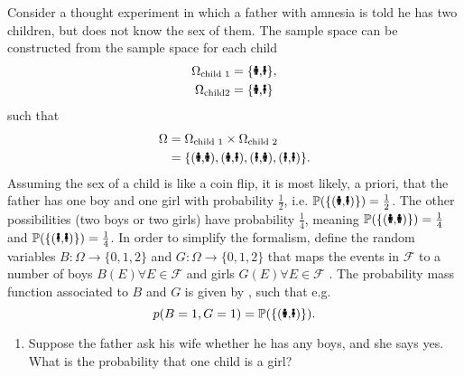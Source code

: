 \begin{example}
	Consider a thought experiment in which a father with amnesia is told he has two children, but does not know the sex of them. The sample space can be constructed from the sample space for each child
	\begin{equation}
		\begin{split}
			\Omega_{\text{child 1}} &= \{\text{\Gentsroom,\Ladiesroom}\},\\
			\Omega_{\text{child2}} &= \{\text{\Gentsroom,\Ladiesroom}\}\\
		\end{split}
	\end{equation}
	such that
	\begin{equation}
		\begin{split}
			\Omega &= \Omega_{\text{child 1}}\times \Omega_{\text{child 2}}\\
			&= \{(\text{\Gentsroom,\Gentsroom}),(\text{\Gentsroom,\Ladiesroom}),(\text{\Ladiesroom,\Gentsroom}),(\text{\Ladiesroom,\Ladiesroom})\}.
		\end{split}
	\end{equation}
	Assuming the sex of a child is like a coin flip, it is most likely, a priori, that the father has one boy and one girl with probability $\frac{1}{2}$, i.e.  $\mathbb{P}(\{(\text{\Gentsroom,\Ladiesroom})\})=\frac{1}{2}$. The other possibilities (two boys or two girls) have probability $\frac{1}{4}$, meaning $\mathbb{P}(\{(\text{\Gentsroom,\Gentsroom})\})=\frac{1}{4}$ and $\mathbb{P}(\{(\text{\Ladiesroom,\Ladiesroom})\})=\frac{1}{4}$. In order to simplify the formalism, define the random variables $B: \Omega \to \{0,1,2\}$ and $G: \Omega \to \{0,1,2\}$ that maps the events in $\mathcal{F}$ to a number of boys $B(E)\forall E\in \mathcal{F}$ and girls $G(E)\forall E\in \mathcal{F}$ . The probability mass function associated to $B$ and $G$ is given by , such that e.g.
	\begin{equation}
		p(B = 1, G = 1)= \mathbb{P}(\{(\text{\Gentsroom,\Ladiesroom})\}).
	\end{equation}

	\begin{enumerate}
		\item Suppose the father ask his wife whether he has any boys, and she says yes. What is the probability that one child is a girl?
		

\end{enumerate}
\end{example}
